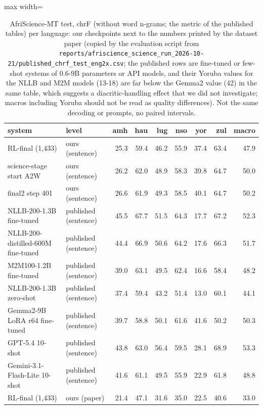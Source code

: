 \begin{table}[t]
\centering
\scriptsize
\setlength{\tabcolsep}{3pt}
\caption{AfriScience-MT test, chrF (without word n-grams; the metric of the published tables) per language: our checkpoints next to the numbers printed by the dataset paper (copied by the evaluation script from \texttt{reports/afriscience\_science\_run\_2026-10-21/published\_chrf\_test\_eng2x.csv}; the published rows are fine-tuned or few-shot systems of 0.6-9B parameters or API models, and their Yoruba values for the NLLB and M2M models (13-18) are far below the Gemma2 value (42) in the same table, which suggests a diacritic-handling effect that we did not investigate; macros including Yoruba should not be read as quality differences). Not the same decoding or prompts, no paired intervals.}
\label{tab:t_final2_afriscience_pub}
\begin{adjustbox}{max width=\linewidth}
{\def\LTcaptype{none} %
\begin{tabular}{@{}llrrrrrrr@{}}
\toprule
system & level & amh & hau & lug & nso & yor & zul & macro \\
\midrule
RL-final (1,433) & ours (sentence) & 25.3 & 59.4 & 46.2 & 55.9 & 37.4 & 63.4 & 47.9 \\
science-stage start A2W & ours (sentence) & 26.2 & 62.0 & 48.9 & 58.3 & 39.8 & 64.7 & 50.0 \\
final2 step 401 & ours (sentence) & 26.6 & 61.9 & 49.3 & 58.5 & 40.1 & 64.7 & 50.2 \\
NLLB-200-1.3B fine-tuned & published (sentence) & 45.5 & 67.7 & 51.5 & 64.3 & 17.7 & 67.2 & 52.3 \\
NLLB-200-distilled-600M fine-tuned & published (sentence) & 44.4 & 66.9 & 50.6 & 64.2 & 17.6 & 66.3 & 51.7 \\
M2M100-1.2B fine-tuned & published (sentence) & 39.0 & 63.1 & 49.5 & 62.4 & 16.6 & 58.4 & 48.2 \\
NLLB-200-1.3B zero-shot & published (sentence) & 37.4 & 59.4 & 43.2 & 51.4 & 13.0 & 60.1 & 44.1 \\
Gemma2-9B LoRA r64 fine-tuned & published (sentence) & 39.7 & 58.8 & 50.1 & 61.6 & 41.6 & 50.2 & 50.3 \\
GPT-5.4 10-shot & published (sentence) & 43.8 & 63.0 & 56.4 & 59.5 & 28.1 & 68.9 & 53.3 \\
Gemini-3.1-Flash-Lite 10-shot & published (sentence) & 41.6 & 61.1 & 49.5 & 55.9 & 22.9 & 61.8 & 48.8 \\
RL-final (1,433) & ours (paper) & 21.4 & 47.1 & 31.6 & 35.0 & 22.5 & 40.6 & 33.0 \\

\end{tabular}}
\end{adjustbox}
\end{table}
